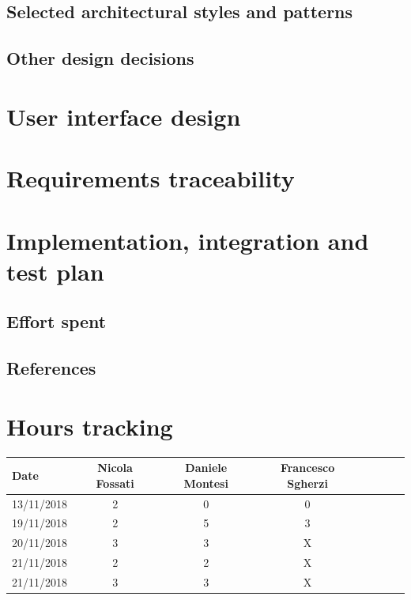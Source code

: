 \documentclass[a4paper,oneside,11pt]{article}
\begin{document}
        \subsection{Selected architectural styles and patterns}
            
        \subsection{Other design decisions}
            
        
    \newpage
    \section{User interface design}
        
    \newpage
    \section{Requirements traceability}
        
    \newpage
    \section{Implementation, integration and test plan}
        
    \newpage
    \subsection{Effort spent}
        
    \newpage
    \subsection{References}
        
        
    \section{Hours tracking}
        \begin{tabular}{l*{6}{c}r}
            Date & Nicola Fossati & Daniele Montesi & Francesco Sgherzi \\
            \hline
            13/11/2018 & 2 & 0 & 0   \\
            \hline
            19/11/2018 & 2 & 5 & 3   \\
            \hline
            20/11/2018 & 3 & 3 & X   \\
            \hline
            21/11/2018 & 2 & 2 & X   \\
            \hline
            21/11/2018 & 3 & 3 & X   \\

        \end{tabular}
\end{document}
